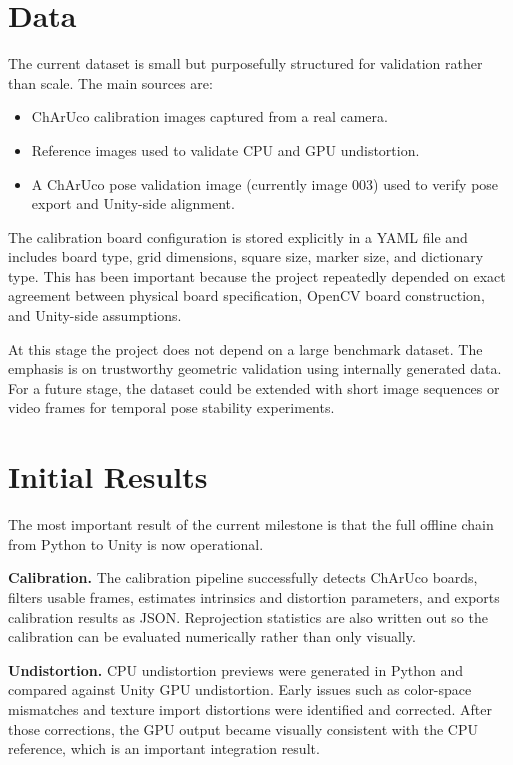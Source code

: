 \documentclass[10pt,twocolumn,letterpaper]{article}
\begin{document}
\section{Data}

The current dataset is small but purposefully structured for validation rather than scale. The main sources are:

\begin{itemize}
\item ChArUco calibration images captured from a real camera.
\item Reference images used to validate CPU and GPU undistortion.
\item A ChArUco pose validation image (currently image 003) used to verify pose export and Unity-side alignment.
\end{itemize}

The calibration board configuration is stored explicitly in a YAML file and includes board type, grid dimensions, square size, marker size, and dictionary type. This has been important because the project repeatedly depended on exact agreement between physical board specification, OpenCV board construction, and Unity-side assumptions.

At this stage the project does not depend on a large benchmark dataset. The emphasis is on trustworthy geometric validation using internally generated data. For a future stage, the dataset could be extended with short image sequences or video frames for temporal pose stability experiments.

\section{Initial Results}

The most important result of the current milestone is that the full offline chain from Python to Unity is now operational.

\textbf{Calibration.}
The calibration pipeline successfully detects ChArUco boards, filters usable frames, estimates intrinsics and distortion parameters, and exports calibration results as JSON. Reprojection statistics are also written out so the calibration can be evaluated numerically rather than only visually.

\textbf{Undistortion.}
CPU undistortion previews were generated in Python and compared against Unity GPU undistortion. Early issues such as color-space mismatches and texture import distortions were identified and corrected. After those corrections, the GPU output became visually consistent with the CPU reference, which is an important integration result.
\end{document}
